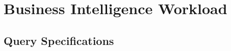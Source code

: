 \chapter{Business Intelligence Workload}



\section{Query Specifications}

\clearpage



























